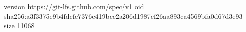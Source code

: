 version https://git-lfs.github.com/spec/v1
oid sha256:a3f3375e9b4fdcfe7376c419bcc2a206d1987cf26aa893ca4569bfa0d67d3e93
size 11068
